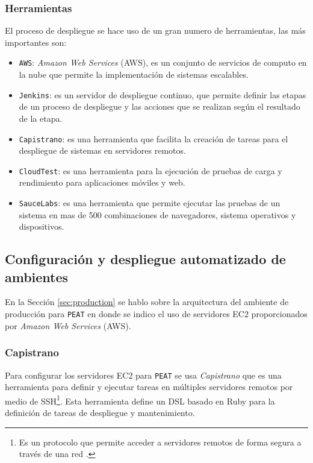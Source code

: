 \subsubsection{Herramientas}

El proceso de despliegue se hace uso de un gran numero de herramientas, las más
importantes son:

\begin{itemize}
\item \texttt{AWS}: \textit{Amazon Web Services} (AWS), es un conjunto de servicios
  de computo en la nube que permite la implementación de sistemas escalables.
\item \texttt{Jenkins}: es un servidor de despliegue continuo, que permite
  definir las etapas de un proceso de despliegue y las acciones que se realizan
  según el resultado de la etapa.
\item \texttt{Capistrano}: es una herramienta que facilita la creación de tareas
  para el despliegue de sistemas en servidores remotos.
\item \texttt{CloudTest}: es una herramienta para la ejecución de pruebas de
  carga y rendimiento para aplicaciones móviles y web.
\item \texttt{SauceLabs}: es una herramienta que permite ejecutar las pruebas de un
  sistema en mas de 500 combinaciones de navegadores, sistema operativos
  y dispositivos.
\end{itemize}

\subsection{Configuración y despliegue automatizado de ambientes}

En la Sección \ref{sec:production} se hablo sobre la arquitectura del ambiente
de producción para \texttt{PEAT} en donde se indico el uso de servidores EC2
proporcionados por \textit{Amazon Web Services} (AWS).

\subsubsection{Capistrano}

Para configurar los servidores EC2 para \texttt{PEAT} se usa \textit{Capistrano}
que es una herramienta para definir y ejecutar tareas en
múltiples servidores remotos por medio de SSH\footnote{Es un protocolo que permite
  acceder a servidores remotos de forma segura a través de una red
  \cite{29_ssh_protocol}.}. Esta herramienta define un DSL basado en Ruby para la
definición de tareas de despliegue y mantenimiento.

